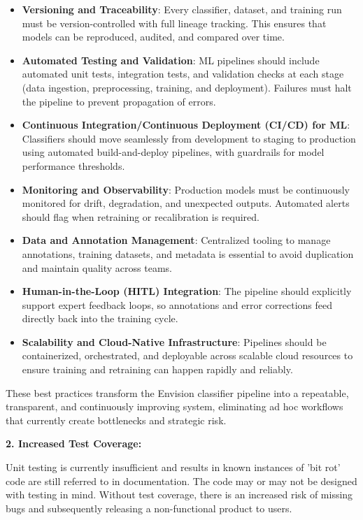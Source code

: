 \documentclass[11pt,a4paper]{article}
\begin{document}
\begin{itemize}
    \item \textbf{Versioning and Traceability}: Every classifier, dataset, and training run must be version-controlled with full lineage tracking. This ensures that models can be reproduced, audited, and compared over time.
    \item \textbf{Automated Testing and Validation}: ML pipelines should include automated unit tests, integration tests, and validation checks at each stage (data ingestion, preprocessing, training, and deployment). Failures must halt the pipeline to prevent propagation of errors.
    \item \textbf{Continuous Integration/Continuous Deployment (CI/CD) for ML}: Classifiers should move seamlessly from development to staging to production using automated build-and-deploy pipelines, with guardrails for model performance thresholds.
    \item \textbf{Monitoring and Observability}: Production models must be continuously monitored for drift, degradation, and unexpected outputs. Automated alerts should flag when retraining or recalibration is required.
    \item \textbf{Data and Annotation Management}: Centralized tooling to manage annotations, training datasets, and metadata is essential to avoid duplication and maintain quality across teams.
    \item \textbf{Human-in-the-Loop (HITL) Integration}: The pipeline should explicitly support expert feedback loops, so annotations and error corrections feed directly back into the training cycle.
    \item \textbf{Scalability and Cloud-Native Infrastructure}: Pipelines should be containerized, orchestrated, and deployable across scalable cloud resources to ensure training and retraining can happen rapidly and reliably.
\end{itemize}
These best practices transform the Envision classifier pipeline into a repeatable, transparent, and continuously improving system, eliminating ad hoc workflows that currently create bottlenecks and strategic risk.

\textbf{2. Increased Test Coverage:}

Unit testing is currently insufficient and results in known instances of 'bit rot' code are still referred to in documentation. The code may or may not be designed with testing
in mind. Without test coverage, there is an increased risk of missing bugs and
subsequently releasing a non-functional product to users.
\end{document}

